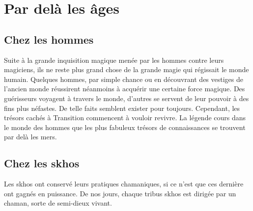 \section{Par delà les âges}
\subsection{Chez les hommes}
Suite à la grande inquisition magique menée par les hommes contre leurs magiciens, ils ne reste plus grand chose de la grande magie qui régissait le monde humain.
Quelques hommes, par simple chance ou en découvrant des vestiges de l'ancien monde réussirent néanmoins à acquérir une certaine force magique. Des guérisseurs voyagent à travers le monde, d'autres se servent de leur pouvoir à des fins plus néfastes. De telle faits semblent exister pour toujours. Cependant, les trésors cachés à Transition commencent à vouloir revivre. La légende cours dans le monde des hommes que les plus fabuleux trésors de connaissances se trouvent par delà les mers.
\subsection{Chez les skhos}
Les skhos ont conservé leurs pratiques chamaniques, si ce n'est que ces dernière ont gagnés en puissance. De nos jours, chaque tribus skhos est dirigée par un chaman, sorte de semi-dieux vivant.